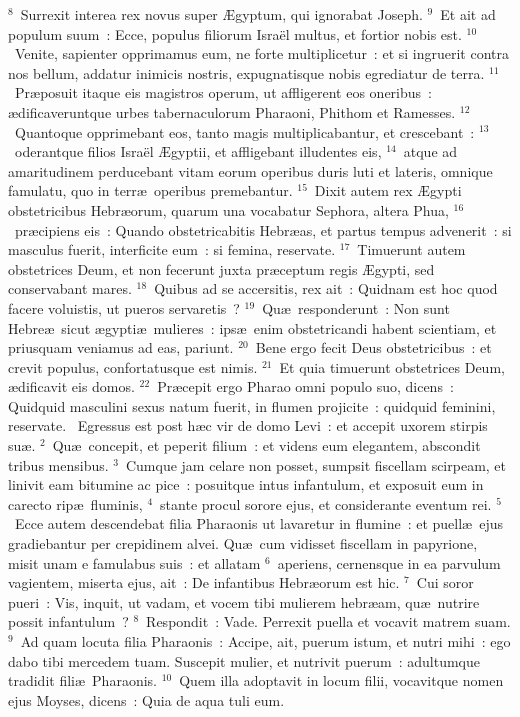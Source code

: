 ${}^{8}$~Surrexit interea rex novus super \AE gyptum, qui ignorabat Joseph.
${}^{9}$~Et ait ad populum suum~: Ecce, populus filiorum Isra\"el multus, et fortior nobis est.
${}^{10}$~Venite, sapienter opprimamus eum, ne forte multiplicetur~: et si ingruerit contra nos bellum, addatur inimicis nostris, expugnatisque nobis egrediatur de terra.
${}^{11}$~Pr\ae posuit itaque eis magistros operum, ut affligerent eos oneribus~: \ae dificaveruntque urbes tabernaculorum Pharaoni, Phithom et Ramesses.
${}^{12}$~Quantoque opprimebant eos, tanto magis multiplicabantur, et crescebant~:
${}^{13}$~oderantque filios Isra\"el \AE gyptii, et affligebant illudentes eis,
${}^{14}$~atque ad amaritudinem perducebant vitam eorum operibus duris luti et lateris, omnique famulatu, quo in terr\ae\ operibus premebantur.
${}^{15}$~Dixit autem rex \AE gypti obstetricibus Hebr\ae orum, quarum una vocabatur Sephora, altera Phua,
${}^{16}$~pr\ae cipiens eis~: Quando obstetricabitis Hebr\ae as, et partus tempus advenerit~: si masculus fuerit, interficite eum~: si femina, reservate.
${}^{17}$~Timuerunt autem obstetrices Deum, et non fecerunt juxta pr\ae ceptum regis \AE gypti, sed conservabant mares.
${}^{18}$~Quibus ad se accersitis, rex ait~: Quidnam est hoc quod facere voluistis, ut pueros servaretis~?
${}^{19}$~Qu\ae\ responderunt~: Non sunt Hebre\ae\ sicut \ae gypti\ae\ mulieres~: ips\ae\ enim obstetricandi habent scientiam, et priusquam veniamus ad eas, pariunt.
${}^{20}$~Bene ergo fecit Deus obstetricibus~: et crevit populus, confortatusque est nimis.
${}^{21}$~Et quia timuerunt obstetrices Deum, \ae dificavit eis domos.
${}^{22}$~Pr\ae cepit ergo Pharao omni populo suo, dicens~: Quidquid masculini sexus natum fuerit, in flumen projicite~: quidquid feminini, reservate.
~Egressus est post h\ae c vir de domo Levi~: et accepit uxorem stirpis su\ae .
${}^{2}$~Qu\ae\ concepit, et peperit filium~: et videns eum elegantem, abscondit tribus mensibus.
${}^{3}$~Cumque jam celare non posset, sumpsit fiscellam scirpeam, et linivit eam bitumine ac pice~: posuitque intus infantulum, et exposuit eum in carecto rip\ae\ fluminis,
${}^{4}$~stante procul sorore ejus, et considerante eventum rei.
${}^{5}$~Ecce autem descendebat filia Pharaonis ut lavaretur in flumine~: et puell\ae\ ejus gradiebantur per crepidinem alvei. Qu\ae\ cum vidisset fiscellam in papyrione, misit unam e famulabus suis~: et allatam
${}^{6}$~aperiens, cernensque in ea parvulum vagientem, miserta ejus, ait~: De infantibus Hebr\ae orum est hic.
${}^{7}$~Cui soror pueri~: Vis, inquit, ut vadam, et vocem tibi mulierem hebr\ae am, qu\ae\ nutrire possit infantulum~?
${}^{8}$~Respondit~: Vade. Perrexit puella et vocavit matrem suam.
${}^{9}$~Ad quam locuta filia Pharaonis~: Accipe, ait, puerum istum, et nutri mihi~: ego dabo tibi mercedem tuam. Suscepit mulier, et nutrivit puerum~: adultumque tradidit fili\ae\ Pharaonis.
${}^{10}$~Quem illa adoptavit in locum filii, vocavitque nomen ejus Moyses, dicens~: Quia de aqua tuli eum.


